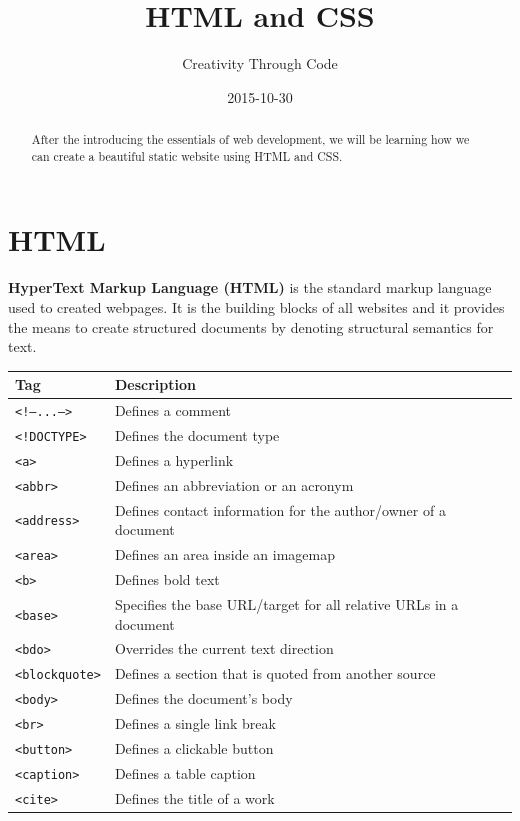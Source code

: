 \documentclass[11pt, letterpaper]{article}
\title{HTML and CSS}
\date{2015-10-30}
\author{Creativity Through Code}
\begin{document}
	\maketitle
	\newpage
	\begin{abstract}
		After the introducing the essentials of web development, we will be learning how we can create a beautiful static website using HTML and CSS.
	\end{abstract}
	\section{HTML}
		\textbf{HyperText Markup Language (HTML)} is the standard markup language used to created webpages. It is the building blocks of all websites and it provides the means to create structured documents by denoting structural semantics for text.
		\begin{longtable}{l p{10cm} l}
			\toprule
			Tag & Description \\\midrule
			\texttt{<!---...--->} & Defines a comment \\\midrule
			\texttt{<!DOCTYPE>} & Defines the document type \\\midrule
			\texttt{<a>} & Defines a hyperlink \\\midrule
			\texttt{<abbr>} & Defines an abbreviation or an acronym \\\midrule
			\texttt{<address>} & Defines contact information for the author/owner of a document \\\midrule
			\texttt{<area>} & Defines an area inside an image­map
\\\midrule
			\texttt{<b>} & Defines bold text \\\midrule
			\texttt{<base>} & Specifies the base URL/target for all relative URLs in a document \\\midrule
			\texttt{<bdo>} & Overrides the current text direction \\\midrule
			\texttt{<blockquote>} & Defines a section that is quoted from another source \\\midrule
			\texttt{<body>} & Defines the document's body \\\midrule
			\texttt{<br>} & Defines a single link break \\\midrule
			\texttt{<button>} & Defines a clickable button \\\midrule
			\texttt{<caption>} & Defines a table caption \\\midrule
			\texttt{<cite>} & Defines the title of a work\\\midrule

\end{longtable}
\end{document}
